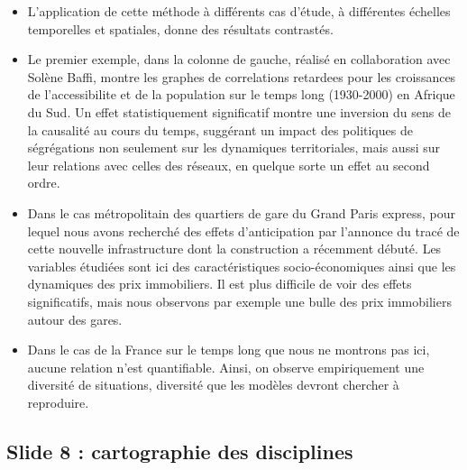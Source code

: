 \documentclass[11pt]{article}
\begin{document}
\begin{itemize}
	\item L'application de cette méthode à différents cas d'étude, à différentes échelles temporelles et spatiales, donne des résultats contrastés.
	\item Le premier exemple, dans la colonne de gauche, réalisé en collaboration avec Solène Baffi, montre les graphes de correlations retardees pour les croissances de l'accessibilite et de la population sur le temps long (1930-2000) en Afrique du Sud. Un effet statistiquement significatif montre une inversion du sens de la causalité au cours du temps, suggérant un impact des politiques de ségrégations non seulement sur les dynamiques territoriales, mais aussi sur leur relations avec celles des réseaux, en quelque sorte un effet au second ordre.
	\item Dans le cas métropolitain des quartiers de gare du Grand Paris express, pour lequel nous avons recherché des effets d'anticipation par l'annonce du tracé de cette nouvelle infrastructure dont la construction a récemment débuté. Les variables étudiées sont ici des caractéristiques socio-économiques ainsi que les dynamiques des prix immobiliers. Il est plus difficile de voir des effets significatifs, mais nous observons par exemple une bulle des prix immobiliers autour des gares.
	\item Dans le cas de la France sur le temps long que nous ne montrons pas ici, aucune relation n'est quantifiable. Ainsi, on observe empiriquement une diversité de situations, diversité que les modèles devront chercher à reproduire.
\end{itemize}

\subsection*{Slide 8 : cartographie des disciplines}
\end{document}
